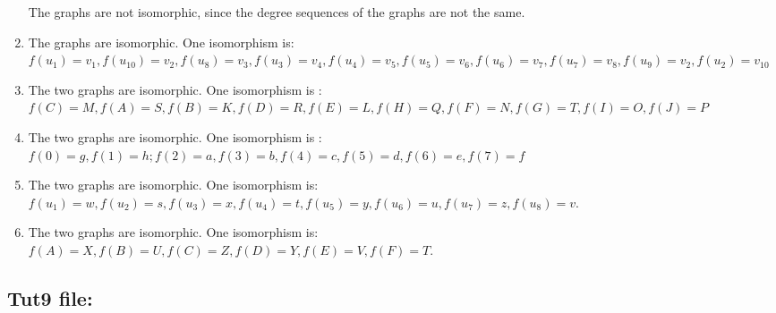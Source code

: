 \documentclass[a4paper]{article}
\begin{document}
\begin{enumerate}[label = \alph*)]
	    The graphs are not isomorphic, since the degree sequences of the graphs are not the same.
	    \item The graphs are isomorphic. One isomorphism is: \\
	        $f(u_1)=v_1,f(u_{10})=v_2,f(u_8)=v_3,f(u_3)=v_4,f(u_4)=v_5,f(u_5)=v_6,f(u_6)=v_7,f(u_7)=v_8,f(u_9)=v_2,f(u_2)=v_{10}$
	    \item The two graphs are isomorphic. One isomorphism is : \\
            $f(C)=M,f(A)=S,f(B)=K,f(D)=R,f(E)=L,f(H)=Q, f(F)=N ,f(G)=T,f(I)=O,f(J)=P$
        \item The two graphs are isomorphic. One isomorphism is : \\
            $f(0)=g,f(1)=h;f(2)=a,f(3)=b,f(4)=c,f(5)=d,f(6)=e,f(7)=f$
        \item  The two graphs are isomorphic. One isomorphism is:\\ $f(u_1) = w, f(u_2) = s, f(u_3) = x,f(u_4) = t, f(u_5) = y, f(u_6)=u, f(u_7) = z , f(u_8) = v $.
        \item The two graphs are isomorphic. One isomorphism is:\\ $f(A) = X, f(B) = U, f(C) = Z,f(D) = Y, f(E) = V, f(F) = T  $.
	    \end{enumerate}




	
	\subsection*{Tut9 file:}
\end{document}
